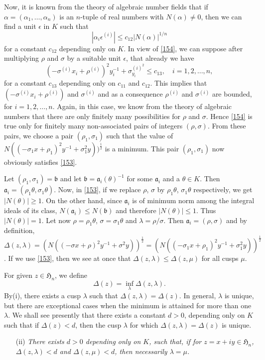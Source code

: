 Now, it is known from the theory of algebraic number fields that if
$\alpha=(\alpha_{1},\ldots,\alpha_{n})$ is an $n$-tuple of real
numbers with $N(\alpha)\neq 0$, then we can find a unit $\epsilon$ in
$K$ such that
\begin{equation*}
|\alpha_{i}\epsilon^{(i)}|\leq c_{12}|N(\alpha)|^{1/n}\tag{155}\label{155}
\end{equation*}
for a constant $c_{12}$ depending only on $K$. In view of \eqref{154},
we can suppose after multiplying $\rho$ and $\sigma$ by a suitable
unit $\epsilon$, that already we have
$$
(-\sigma^{(i)}x_{i}+\rho^{(i)})^{2}y_{i}^{-1}+\sigma^{(i)^{2}}_{y_{i}}\leq
c_{13},\quad i=1,2,\ldots,n,
$$
for a constant $c_{13}$ depending only on $c_{11}$ and $c_{12}$. This
implies that $(-\sigma^{(i)}x_{i}+\rho^{(i)})$ and $\sigma^{(i)}$ and
as a consequence $\rho^{(i)}$ and $\sigma^{(i)}$ are bounded, for
$i=1,2,\ldots,n$. Again, in this case, we know from the theory of
algebraic numbers that there are only finitely many possibilities for
$\rho$ and $\sigma$. Hence \eqref{154} is true only for finitely many
non-associated pairs of integers $(\rho,\sigma)$. From these pairs, we
choose a pair $(\rho_{1},\sigma_{1})$ such that the value of
$N((-\sigma_{1}x+\rho_{1})^{2}y^{-1}+\sigma^{2}_{1}y))^{\frac{1}{2}}$
is a minimum. This pair $(\rho_{1},\sigma_{1})$ now obviously
satisfies \eqref{153}.

Let $(\rho_{1},\sigma_{1})=\mathfrak{b}$ and let
$\mathfrak{b}=\mathfrak{a}_{i}(\theta)^{-1}$ for some
$\mathfrak{a}_{i}$ and a $\theta\in K$. Then
$\mathfrak{a}_{i}=(\rho_{1}\theta,\sigma_{1}\theta)$. Now, in
\eqref{153}, if we replace $\rho$, $\sigma$ by $\rho_{1}\theta$,
$\sigma_{1}\theta$ respectively, we get $|N(\theta)|\geq 1$. On the
other hand, since $\mathfrak{a}_{i}$ is of minimum norm among the
integral ideals of its class, $N(\mathfrak{a}_{i})\leq
N(\mathfrak{b})$ and therefore $|N(\theta)|\leq 1$. Thus
$|N(\theta)|=1$. Let now $\rho=\rho_{1}\theta$,
$\sigma=\sigma_{1}\theta$ and $\lambda=\rho/\sigma$. Then
$\mathfrak{a}_{i}=(\rho,\sigma)$ and by definition,
$\Delta(z,\lambda)=(N((-\sigma
x+\rho)^{2}y^{-1}+\sigma^{2}y))^{\frac{1}{2}}=(N((-\sigma_{1}x+\rho_{1})^{2}y^{-1}+\sigma^{2}_{1}y))^{\frac{1}{2}}$. If
we use \eqref{153}, then we see at once that $\Delta(z,\lambda)\leq
\Delta(z,\mu)$ for all cusps $\mu$.

For given $z\in \mathfrak{H}_{n}$, we define
$$
\Delta(z)=\inf_{\lambda}\Delta(z,\lambda).
$$
By\pageoriginale (i), there exists a cusp $\lambda$ such that
$\Delta(z,\lambda)=\Delta(z)$. In general, $\lambda$ is unique, but
there are exceptional cases when the minimum is attained for more than
one $\lambda$. We shall see presently that there exists a constant
$d>0$, depending only on $K$ such that if $\Delta(z)<d$, then the cusp
$\lambda$ for which $\Delta(z,\lambda)=\Delta(z)$ is unique.
\begin{itemize}
\item[(ii)] {\em There exists $d>0$ depending only on $K$, such that,
  if for $z=x+iy\in\mathfrak{H}_{n}$, $\Delta(z,\lambda)<d$ and
  $\Delta(z,\mu)<d$, then necessarily $\lambda=\mu$.} 
\end{itemize}

